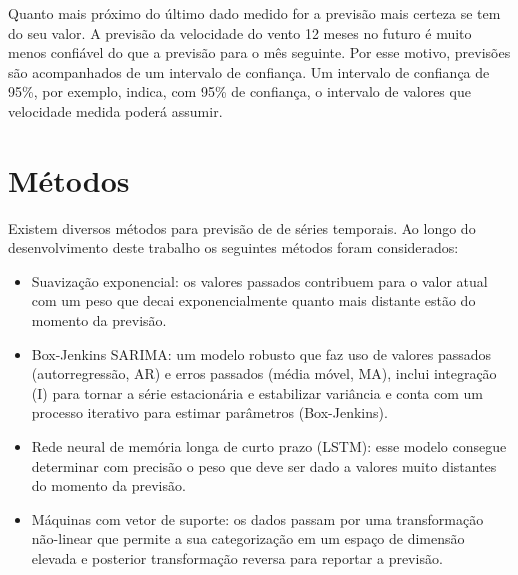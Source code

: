 \documentclass[
	12pt,				%
	openright,			%
	oneside,			%
	a4paper,			%
	english,			%
	french,				%
	spanish,			%
	brazil				%
	]{abntex2}
\begin{document}
Quanto mais próximo do último dado medido for a previsão mais certeza se tem do seu valor. A previsão da velocidade do vento 12 meses no futuro é muito menos confiável do que a previsão para o mês seguinte. Por esse motivo, previsões são acompanhados de um intervalo de confiança. Um intervalo de confiança de 95\%, por exemplo, indica, com 95\% de confiança, o intervalo de valores que velocidade medida poderá assumir.


\section{Métodos}

Existem diversos métodos para previsão de de séries temporais. Ao longo do desenvolvimento deste trabalho os seguintes métodos foram considerados: 
\begin{itemize}
\item Suavização exponencial: os valores passados contribuem para o valor atual com um peso que decai exponencialmente quanto mais distante estão do momento da previsão.
\item Box-Jenkins SARIMA: um modelo robusto que faz uso de valores passados (autorregressão, AR) e erros passados (média móvel, MA), inclui integração (I) para tornar a série estacionária e estabilizar variância e conta com um processo iterativo para estimar parâmetros (Box-Jenkins).
\item Rede neural de memória longa de curto prazo (LSTM): esse modelo consegue determinar com precisão o peso que deve ser dado a valores muito distantes do momento da previsão.
\item Máquinas com vetor de suporte: os dados passam por uma transformação não-linear que permite a sua categorização em um espaço de dimensão elevada e posterior transformação reversa para reportar a previsão.
\end{itemize}
\end{document}
